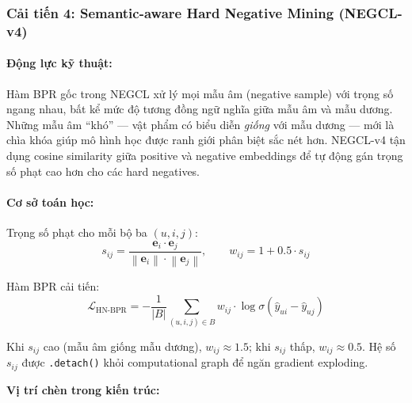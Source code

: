 \subsubsection{Cải tiến 4: Semantic-aware Hard Negative Mining (NEGCL-v4)}

\paragraph{Động lực kỹ thuật:}
Hàm BPR gốc trong NEGCL xử lý mọi mẫu âm (negative sample) với trọng số ngang nhau, bất kể mức độ tương đồng ngữ nghĩa giữa mẫu âm và mẫu dương. Những mẫu âm ``khó'' --- vật phẩm có biểu diễn \textit{giống} với mẫu dương --- mới là chìa khóa giúp mô hình học được ranh giới phân biệt sắc nét hơn. NEGCL-v4 tận dụng cosine similarity giữa positive và negative embeddings để tự động gán trọng số phạt cao hơn cho các hard negatives.

\paragraph{Cơ sở toán học:}
Trọng số phạt cho mỗi bộ ba $(u, i, j)$:
\begin{equation}
s_{ij} = \frac{\mathbf{e}_i \cdot \mathbf{e}_j}{\left\|\mathbf{e}_i\right\| \cdot \left\|\mathbf{e}_j\right\|}, \qquad
w_{ij} = 1 + 0.5 \cdot s_{ij}
\end{equation}

Hàm BPR cải tiến:
\begin{equation}
\mathcal{L}_{\text{HN-BPR}} = -\frac{1}{|B|}\sum_{(u,i,j) \in B} w_{ij} \cdot \log \sigma\!\left(\hat{y}_{ui} - \hat{y}_{uj}\right)
\end{equation}

Khi $s_{ij}$ cao (mẫu âm giống mẫu dương), $w_{ij} \approx 1.5$; khi $s_{ij}$ thấp, $w_{ij} \approx 0.5$. Hệ số $s_{ij}$ được \texttt{.detach()} khỏi computational graph để ngăn gradient exploding.

\par\medskip
\noindent\textbf{Vị trí chèn trong kiến trúc:}\par
\nopagebreak[4]

